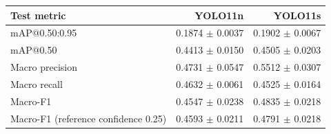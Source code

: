 \begin{tabular}{lrr}
\toprule
Test metric & YOLO11n & YOLO11s \\
\midrule
mAP@0.50:0.95 & 0.1874 $\pm$ 0.0037 & 0.1902 $\pm$ 0.0067 \\
mAP@0.50 & 0.4413 $\pm$ 0.0150 & 0.4505 $\pm$ 0.0203 \\
Macro precision & 0.4731 $\pm$ 0.0547 & 0.5512 $\pm$ 0.0307 \\
Macro recall & 0.4632 $\pm$ 0.0061 & 0.4525 $\pm$ 0.0164 \\
Macro-F1 & 0.4547 $\pm$ 0.0238 & 0.4835 $\pm$ 0.0218 \\
Macro-F1 (reference confidence 0.25) & 0.4593 $\pm$ 0.0211 & 0.4791 $\pm$ 0.0218 \\
\bottomrule
\end{tabular}
